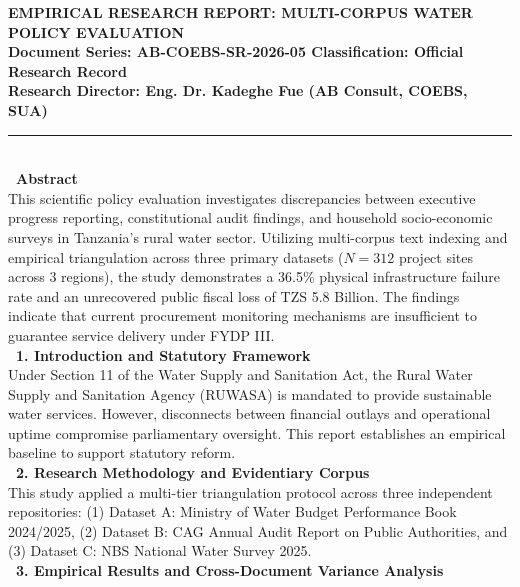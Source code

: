 \documentclass[11pt, a4paper]{report}
\begin{document}
\begin{tcolorbox}[colback=lightgrey, colframe=bordergrey, title=\textbf{Deliverable 5C Preview: \texttt{Report3\_Scientific\_Water\_Oversight.md}}]
\small
\textcolor{tanzaniablue}{\textbf{EMPIRICAL RESEARCH REPORT: MULTI-CORPUS WATER POLICY EVALUATION}}\\
\textbf{\textcolor{tanzaniablue}{Document Series:} AB-COEBS-SR-2026-05 \quad \textbar{} \quad \textcolor{tanzaniablue}{\textbf{Classification:}} Official Research Record}\\
\textbf{\textcolor{tanzaniablue}{Research Director:} Eng. Dr. Kadeghe Fue (AB Consult, COEBS, SUA)}\\[0.2cm]
\rule{\textwidth}{0.4pt}\\[0.2cm]
\textcolor{tanzaniablue}{\textbf{\ Abstract}}\\
This scientific policy evaluation investigates discrepancies between executive progress reporting, constitutional audit findings, and household socio-economic surveys in Tanzania's rural water sector. Utilizing multi-corpus text indexing and empirical triangulation across three primary datasets ($N=312$ project sites across 3 regions), the study demonstrates a 36.5\% physical infrastructure failure rate and an unrecovered public fiscal loss of TZS 5.8 Billion. The findings indicate that current procurement monitoring mechanisms are insufficient to guarantee service delivery under FYDP III.\\[0.2cm]
\textcolor{tanzaniablue}{\textbf{\ 1. Introduction and Statutory Framework}}\\
Under Section 11 of the Water Supply and Sanitation Act, the Rural Water Supply and Sanitation Agency (RUWASA) is mandated to provide sustainable water services. However, disconnects between financial outlays and operational uptime compromise parliamentary oversight. This report establishes an empirical baseline to support statutory reform.\\[0.2cm]
\textcolor{tanzaniablue}{\textbf{\ 2. Research Methodology and Evidentiary Corpus}}\\
This study applied a multi-tier triangulation protocol across three independent repositories: (1) Dataset A: Ministry of Water Budget Performance Book 2024/2025, (2) Dataset B: CAG Annual Audit Report on Public Authorities, and (3) Dataset C: NBS National Water Survey 2025.\\[0.2cm]
\textcolor{tanzaniablue}{\textbf{\ 3. Empirical Results and Cross-Document Variance Analysis}}\\

\end{tcolorbox}
\end{document}

